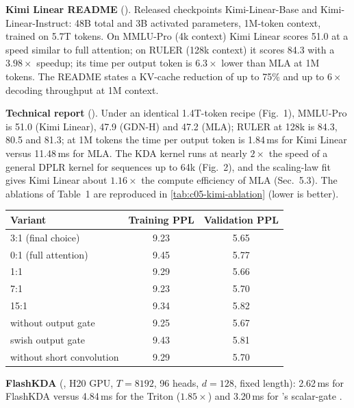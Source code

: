 \begin{results}
\textbf{Kimi Linear README} (). Released
checkpoints Kimi-Linear-Base and Kimi-Linear-Instruct: 48B total and 3B activated parameters,
1M-token context, trained on 5.7T tokens. On MMLU-Pro (4k context) Kimi Linear scores 51.0 at a
speed similar to full attention; on RULER (128k context) it scores 84.3 with a $3.98\times$
speedup; its time per output token is $6.3\times$ lower than MLA at 1M tokens. The README states
a KV-cache reduction of up to 75\% and up to $6\times$ decoding throughput at 1M context.

\textbf{Technical report} (). Under an
identical 1.4T-token recipe (Fig.~1), MMLU-Pro is 51.0 (Kimi Linear), 47.9 (GDN-H) and 47.2
(MLA); RULER at 128k is 84.3, 80.5 and 81.3; at 1M tokens the time per output token is 1.84\,ms
for Kimi Linear versus 11.48\,ms for MLA. The KDA kernel runs at nearly $2\times$ the speed of a
general DPLR kernel for sequences up to 64k (Fig.~2), and the scaling-law fit gives Kimi Linear
about $1.16\times$ the compute efficiency of MLA (Sec.~5.3). The ablations of Table~1 are
reproduced in \cref{tab:c05-kimi-ablation} (lower is better).

\begin{center}\small
{}
\label{tab:c05-kimi-ablation}
\begin{tabular}{@{}lcc@{}}
\toprule
Variant & Training PPL & Validation PPL \\
\midrule
3:1 (final choice) & 9.23 & 5.65 \\
0:1 (full attention) & 9.45 & 5.77 \\
1:1 & 9.29 & 5.66 \\
7:1 & 9.23 & 5.70 \\
15:1 & 9.34 & 5.82 \\
without output gate & 9.25 & 5.67 \\
swish output gate & 9.43 & 5.81 \\
without short convolution & 9.29 & 5.70 \\
\bottomrule
\end{tabular}
\end{center}

\textbf{FlashKDA} (, H20 GPU, $T = 8192$,
96 heads, $d = 128$, fixed length): 2.62\,ms for FlashKDA versus 4.84\,ms for the \fla{} Triton
 ($1.85\times$) and 3.20\,ms for \fla{}'s scalar-gate .
\end{results}

